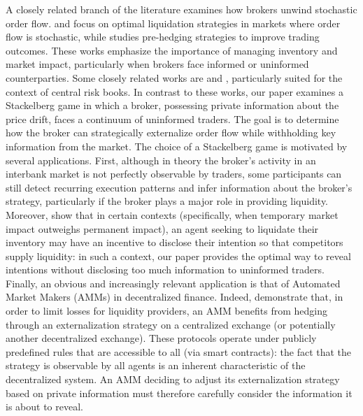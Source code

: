 \documentclass[10pt]{article}
\begin{document}
A closely related branch of the literature examines how brokers unwind stochastic order flow. \citeauthor{cartea2020trading} \cite{cartea2020trading} and \citeauthor{cartea2022double} \cite{cartea2022double} focus on optimal liquidation strategies in markets where order flow is stochastic, while \citeauthor{muhle2023pre} \cite{muhle2023pre} studies pre-hedging strategies to improve trading outcomes. These works emphasize the importance of managing inventory and market impact, particularly when brokers face informed or uninformed counterparties. Some closely related works are \citeauthor{nutz2023unwinding} \cite{nutz2023unwinding} and \citeauthor{bergault2025hedge} \cite{bergault2025hedge}, particularly suited for the context of central risk books. In contrast to these works, our paper examines a Stackelberg game in which a broker, possessing private information about the price drift, faces a continuum of uninformed traders. The goal is to determine how the broker can strategically externalize order flow while withholding key information from the market. The choice of a Stackelberg game is motivated by several applications. First, although in theory the broker’s activity in an interbank market is not perfectly observable by traders, some participants can still detect recurring execution patterns and infer information about the broker’s strategy, particularly if the broker plays a major role in providing liquidity. Moreover, \citeauthor{schoneborn2009liquidation} \cite{schoneborn2009liquidation} show that in certain contexts (specifically, when temporary market impact outweighs permanent impact), an agent seeking to liquidate their inventory may have an incentive to disclose their intention so that competitors supply liquidity: in such a context, our paper provides the optimal way to reveal intentions without disclosing too much information to uninformed traders. Finally, an obvious and increasingly relevant application is that of Automated Market Makers (AMMs) in decentralized finance. Indeed, \citeauthor{milionis2022automated} \cite{milionis2022automated} demonstrate that, in order to limit losses for liquidity providers, an AMM benefits from hedging through an externalization strategy on a centralized exchange (or potentially another decentralized exchange). These protocols operate under publicly predefined rules that are accessible to all (via smart contracts): the fact that the strategy is observable by all agents is an inherent characteristic of the decentralized system. An AMM deciding to adjust its externalization strategy based on private information must therefore carefully consider the information it is about to reveal.\\
\end{document}
